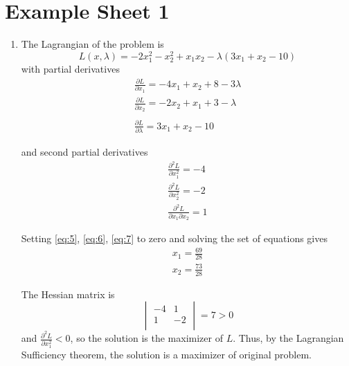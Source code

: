 \chapter{Example Sheet 1}
\label{cha:example-sheet-1}

\newcommand{\dual}{\overset{\star}\equiv}

\begin{enumerate}
\item \label{item:1}
  The Lagrangian of the problem is
  \begin{equation}
    \label{eq:4}
    L(x, \lambda) = -2x_{1}^{2} - x_{2}^{2} + x_{1} x_{2} -
    \lambda(3x_{1} + x_{2} - 10)
  \end{equation} with partial derivatives
  \begin{align}
    \label{eq:5}
    \frac{\partial L}{\partial x_{1}} = -4x_{1} + x_{2} + 8 - 3\lambda \\
    \label{eq:6}
    \frac{\partial L}{\partial x_{2}} = -2x_{2} + x_{1} + 3 - \lambda \\ \\
    \label{eq:7}
    \frac{\partial L}{\partial \lambda} = 3x_{1} + x_{2} - 10
  \end{align}

  and second partial derivatives
  \begin{align}
    \label{eq:8}
    \frac{\partial^{2} L}{\partial x_{1}^{2}} = -4 \\
    \frac{\partial^{2} L}{\partial x_{2}^{2}} = -2 \\
    \frac{\partial^{2} L}{\partial x_{1} \partial x_{2}} = 1 
  \end{align}

  Setting \eqref{eq:5}, \eqref{eq:6}, \eqref{eq:7} to zero and solving
  the set of equations gives
  \begin{align}
    \label{eq:9}
    x_{1} = \frac{69}{28} \\
    x_{2} = \frac{73}{28}
  \end{align}

  The Hessian matrix is
  \begin{equation}
    \label{eq:10}
    \begin{vmatrix}
      -4 & 1 \\
      1 & -2 \\
    \end{vmatrix} = 7 > 0
  \end{equation}
  and $\frac{\partial^{2} L}{\partial x_{1}^{2}} < 0$, so the solution
  is the maximizer of $L$.  Thus, by the Lagrangian Sufficiency
  theorem, the solution is a maximizer of original problem.
  

\end{enumerate}
